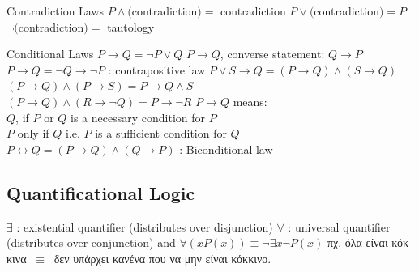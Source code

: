 \documentclass[12pt]{article}
\begin{document}
\begin{flushleft}
	Contradiction Laws \linebreak 
	\textbullet \quad $ P \land ($contradiction$) = $ contradiction \linebreak
	\textbullet \quad $ P \lor ($contradiction$) = P $ \linebreak 
	\textbullet \quad $ \lnot($contradiction$) = $ tautology \linebreak 
	
	Conditional Laws \linebreak 
	\textbullet \quad $ P \rightarrow Q = \lnot P \lor Q $ \linebreak
	\textbullet \quad $ P \rightarrow Q $, converse statement: $ Q \rightarrow P $ \linebreak
	\textbullet \quad $ P \rightarrow Q = \lnot Q \rightarrow \lnot P $  :  contrapositive law \linebreak
	\textbullet \quad $ P \lor S \rightarrow Q = ( P \rightarrow	 Q) \land (S \rightarrow Q) $ \linebreak
	\textbullet \quad $ (P \rightarrow Q) \land (P \rightarrow S) = P \rightarrow Q \land S $ \\
	\textbullet \quad $ (P \rightarrow Q) \land (R \rightarrow \lnot Q) = P \rightarrow \lnot R $ \linebreak 
	\textbullet \quad $ P \rightarrow Q $ means: \\	
	\qquad $Q$, if $P$ or $Q$ is a necessary condition for $P$ \\
	\qquad $P$ only if $Q$ i.e. $P$ is a sufficient condition for $Q$ \\
	\textbullet \quad $P \leftrightarrow Q = (P \rightarrow Q) \land (Q \rightarrow P) $  :  Biconditional law \linebreak
	
	\subsection{Quantificational Logic}
	
	\textbullet \quad $ \exists $  :  existential quantifier (distributes over disjunction) \linebreak
	\textbullet \quad $ \forall $  :  universal quantifier  (distributes over conjunction) \linebreak
	and $\displaystyle \forall \left( x P(x) \right) \equiv \lnot \exists x \lnot P(x) $ \linebreak 
	\textgreek{πχ. όλα είναι κόκκινα} $\ \equiv \ $ \textgreek{δεν υπάρχει κανένα που να μην είναι κόκκινο}. \linebreak 
	

\end{flushleft}
\end{document}

